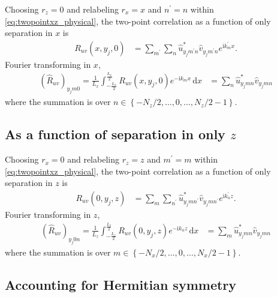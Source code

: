 \documentclass[letterpaper,11pt,nointlimits,reqno]{amsart}
\newcommand{\ii}{\ensuremath{\mathrm{i}}}
\begin{document}
Choosing $r_z = 0$ and relabeling $r_x = x$ and $n^\prime = n$ within
\eqref{eq:twopointxz_physical}, the two-point correlation as a
function of only separation in $x$ is
\begin{align}
R_{uv} \left( x, y_j, 0 \right)
  &= \sum_{m^\prime}
     \sum_{n}
     \hat{u}^\ast_{y_j m^\prime n}
     \hat{v}_{y_j m^\prime n}
     e^{\ii k_m^\prime x}.
    \label{eq:twopointx_physical}
\end{align}
Fourier transforming in $x$,
\begin{align}
\left(\hat{R}_{uv}\right)_{y_j m 0}
   =
    \frac{1}{L_x}
    \int_{-\frac{L_x}{2}}^{\frac{L_x}{2}}
    R_{uv} \left( x, y_j, 0 \right)
    e^{-\ii k_m x}
    \,\mathrm{d}x
  &=
    \sum_{n}
    \hat{u}^\ast_{y_j m n}
    \hat{v}_{y_j m n}
    \label{eq:twopointx_wave}
\end{align}
where the summation is over $n \in \left\{-N_z/2, \dots, 0, \dots,
N_z/2-1\right\}$.

\subsection{As a function of separation in only $z$}

Choosing $r_x = 0$ and relabeling $r_z = z$ and $m^\prime = m$ within
\eqref{eq:twopointxz_physical}, the two-point correlation as a
function of only separation in $z$ is
\begin{align}
R_{uv} \left( 0, y_j, z \right)
  &= \sum_{m}
     \sum_{n^\prime}
     \hat{u}^\ast_{y_j m n^\prime}
     \hat{v}_{y_j m n^\prime}
     e^{\ii k_n^\prime z}.
    \label{eq:twopointz_physical}
\end{align}
Fourier transforming in $z$,
\begin{align}
\left(\hat{R}_{uv}\right)_{y_j 0 n}
   =
    \frac{1}{L_z}
    \int_{-\frac{L_z}{2}}^{\frac{L_z}{2}}
    R_{uv} \left( 0, y_j, z \right)
    e^{-\ii k_n z}
    \,\mathrm{d}x
  &=
    \sum_{m}
    \hat{u}^\ast_{y_j m n}
    \hat{v}_{y_j m n}
    \label{eq:twopointz_wave}
\end{align}
where the summation is over $m \in \left\{-N_x/2, \dots, 0, \dots,
N_x/2-1\right\}$.

\subsection{Accounting for Hermitian symmetry}
\end{document}

